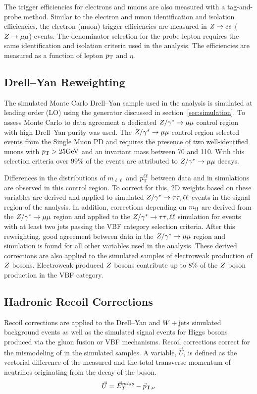 The trigger efficiencies for electrons and muons are also measured with a tag-and-probe method.
Similar to the electron and muon identification and isolation efficiencies, the 
electron (muon) trigger efficiencies are measured in $Z\to ee$ ($Z\to\mu\mu$) events.
The denominator selection for the probe lepton requires the same identification and
isolation criteria used in the analysis. The efficiencies are measured as a function of
lepton $p_\mathrm{T}$ and $\eta$.



\subsection{Drell--Yan Reweighting}
\label{sec:htt_dy_reweighting}
The simulated Monte Carlo Drell--Yan sample used in the analysis is simulated at leading order (LO)
using the \MGAMCNLO generator discussed in section~\ref{sec:simulation}. To assess Monte Carlo to
data agreement a dedicated $Z/\gamma^*\to\mu\mu$ control region with high Drell--Yan purity was used.
The $Z/\gamma^*\to\mu\mu$ control region selected events from the Single Muon PD and requires the 
presence of two well-identified muons with $p_\mathrm{T} > 25 \mathrm{GeV}$ and an invariant mass between 70 and 110\GeV.
With this selection criteria over 99\% of the events are attributed to $Z/\gamma^*\to\mu\mu$ decays.

Differences in the distributions of $m_{\ell\ell}$ and $p_\mathrm{T}^{\ell\ell}$ between data and 
in simulations are observed in this control region. To correct for this, 2D weights based on these variables 
are derived and applied to simulated $Z/\gamma^*\to\tau\tau, \ell\ell$ events in the signal region of the analysis. 
In addition, corrections depending on $m_\mathrm{jj}$ are derived from the $Z/\gamma^*\to\mu\mu$ region and 
applied to the $Z/\gamma^*\to\tau\tau, \ell\ell$ simulation for events with at least two jets passing the 
VBF category selection criteria. After this reweighting, good agreement between data in the 
$Z/\gamma^*\to\mu\mu$ region and simulation is found for all other variables used in the analysis.
These derived corrections are also applied to the simulated samples of electroweak production of $Z$ 
bosons. Electroweak produced $Z$ bosons contribute up to 8\% of the $Z$ boson production in the VBF category.



\subsection{Hadronic Recoil Corrections}
Recoil corrections are applied to the Drell--Yan and $W+\text{jets}$ simulated background events 
as well as the simulated signal events for 
Higgs bosons produced via the gluon fusion or VBF mechanisms. Recoil corrections correct for the
mismodeling of \etvecmiss in the simulated samples. A variable, $\vec{U}$, is defined as the 
vectorial difference of the measured \etvecmiss and the total transverse momentum of neutrinos
originating from the decay of the boson.
\begin{equation}
\vec{U} = \vec{E}^{miss}_T - \vec{p}_{\text{T},\nu}
\end{equation}

